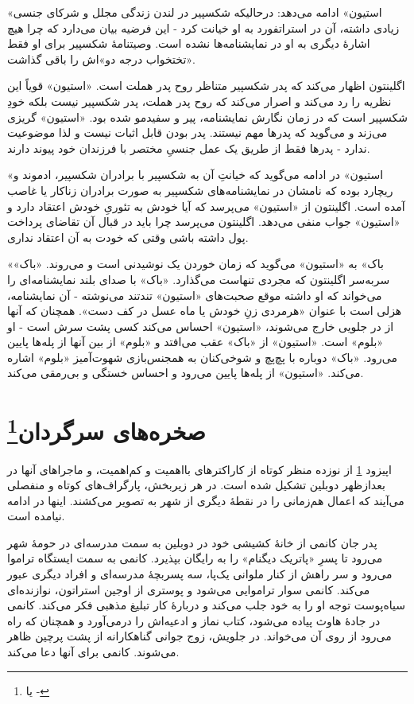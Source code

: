 \documentclass[12pt]{book}
\newcommand{\noun}[1]{«{#1}»}
\begin{document}
    \noun{استیون} ادامه می‌دهد: درحالیکه شکسپیر در لندن زندگی مجلل و شرکای جنسی زیادی داشته، آن در استراتفورد به او خیانت کرد - این فرضیه بیان می‌دارد که چرا هیچ اشارۀ دیگری به او در نمایشنامه‌ها نشده است. وصیتنامۀ شکسپیر برای او فقط «تختخواب درجه دو»اش را باقی گذاشت.

    اگلینتون اظهار می‌کند که پدر شکسپیر متناظر روح پدر هملت است. \noun{استیون} قویاً این نظریه را رد می‌کند و اصرار می‌کند که روح پدر هملت، پدر شکسپیر نیست بلکه خودِ شکسپیر است که در زمان نگارش نمایشنامه، پیر و سفیدمو شده بود. \noun{استیون} گریزی می‌زند و می‌گوید که پدرها مهم نیستند. پدر بودن قابل اثبات نیست و لذا موضوعیت ندارد - پدرها فقط از طریق یک عمل جنسیِ مختصر با فرزندان خود پیوند دارند.

    \noun{استیون} در ادامه می‌گوید که خیانتِ آن به شکسپیر با برادران شکسپیر، ادموند و ریچارد بوده که نامشان در نمایشنامه‌های شکسپیر به صورت برادران زناکار یا غاصب آمده است. اگلینتون از \noun{استیون} می‌پرسد که آیا خودش به تئوریِ خودش اعتقاد دارد و \noun{استیون} جواب منفی می‌دهد. اگلینتون می‌پرسد چرا باید در قبال آن تقاضای پرداخت پول داشته باشی وقتی که خودت به آن اعتقاد نداری.

    \noun{باک}  به \noun{استیون} می‌گوید که زمان خوردن یک نوشیدنی است و می‌روند. \noun{باک}  سربه‌سر اگلینتون که مجردی تنهاست می‌گذارد. \noun{باک}  با صدای بلند نمایشنامه‌ای را می‌خواند که او داشته موقع صحبت‌های \noun{استیون} تندتند می‌نوشته - آن نمایشنامه، هزلی است با عنوان «هرمردی زنِ خودش یا ماه عسل در کف دست». همچنان که آنها از در جلویی خارج می‌شوند، \noun{استیون} احساس می‌کند کسی پشت سرش است - او \noun{بلوم} است. \noun{استیون} از \noun{باک}  عقب می‌افتد و \noun{بلوم} از بین آنها از پله‌ها پایین می‌رود. \noun{باک}  دوباره با پچ‌پچ و شوخی‌کنان به همجنس‌بازی شهوت‌آمیز \noun{بلوم} اشاره می‌کند. \noun{استیون} از پله‌ها پایین می‌رود و احساس خستگی و بی‌رمقی می‌کند.

    \chapter[صخره‌های سرگردان]{صخره‌های سرگردان\protect\footnote{ یا -}}\label{ep:10}
    اپیزود \ref{ep:10} از نوزده منظر کوتاه از کاراکترهای بااهمیت و کم‌اهمیت، و ماجراهای آنها در بعدازظهر دوبلین تشکیل شده است. در هر زیربخش، پارگراف‌های کوتاه و منفصلی می‌آیند که اعمال هم‌زمانی را در نقطۀ دیگری از شهر به تصویر می‌کشند. اینها در ادامه نیامده است.

    پدر جان کانمی از خانۀ کشیشی خود در دوبلین به سمت مدرسه‌ای در حومۀ شهر می‌رود تا پسرِ \noun{پاتریک دیگنام} را به رایگان بپذیرد. کانمی به سمت ایستگاه تراموا می‌رود و سر راهش از کنار ملوانی یک‌پا، سه پسربچۀ مدرسه‌ای و افراد دیگری عبور می‌کند. کانمی سوار تراموایی می‌شود و پوستری از اوجین استراتون، نوازنده‌ای سیاه‌پوست توجه او را به خود جلب می‌کند و دربارۀ کار تبلیغ مذهبی فکر می‌کند. کانمی در جادۀ هاوث پیاده می‌شود، کتاب نماز و ادعیه‌اش را درمی‌آورد و همچنان که راه می‌رود از روی آن می‌خواند. در جلویش، زوج جوانی گناهکارانه از پشت پرچین ظاهر می‌شوند. کانمی برای آنها دعا می‌کند.
\end{document}
